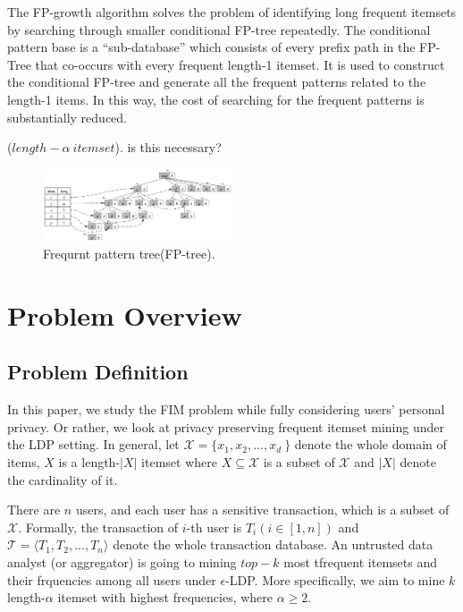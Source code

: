 \documentclass[conference]{IEEEtran}
\begin{document}
The FP-growth algorithm solves the problem of identifying long frequent itemsets by searching through smaller conditional FP-tree repeatedly. The conditional pattern base is a “sub-database” which consists of every prefix path in the FP-Tree that co-occurs with every frequent length-1 itemset. It is used to construct the conditional FP-tree and generate all the frequent patterns related to the length-1 items. In this way, the cost of searching for the frequent patterns is substantially reduced.

\begin{Definition}
($length-\alpha \ itemset$).  {\color{red} is this necessary? }
\end{Definition}

\begin{figure}[htbp]
\centerline{\includegraphics[width=0.5\textwidth]{tree.png}}
\caption{Frequrnt pattern tree(FP-tree).}
\label{fptree}
\end{figure}

\section{Problem Overview}

\subsection{Problem Definition}
In this paper, we study the FIM problem while fully considering users' personal privacy. Or rather, we look at privacy preserving frequent itemset mining under the LDP setting. In general, let $\mathcal{X} = \{x_1,x_2,...,x_d\ \}$ denote the whole domain of items, $X$ is a length-$|X|$ itemset where $X \subseteq \mathcal{X}$ is a subset of $\mathcal{X}$ and $|X|$ denote the cardinality of it.

There are $n$ users, and each user has a sensitive transaction, which is a subset of $\mathcal{X}$. Formally, the transaction of $i$-th user is $T_i(i \in [1,n])$ and $\mathcal{T} = \langle T_1,T_2,...,T_n \rangle$ denote the whole transaction database. An untrusted data analyst (or aggregator) is going to mining $top-k$ most tfrequent itemsets and their frquencies among all users under $\epsilon$-LDP. More specifically, we aim to mine $k$ length-$\alpha$ itemset with highest frequencies, where $\alpha \geq 2$.
\end{document}

